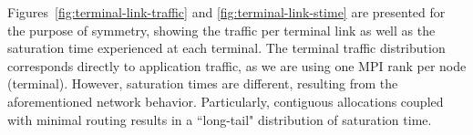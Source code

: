 Figures~\ref{fig:terminal-link-traffic} and \ref{fig:terminal-link-stime} are presented for the purpose of symmetry, 
showing the traffic per terminal link as well as the saturation time experienced at each terminal.
The terminal traffic distribution corresponds directly to application traffic, as we are using one MPI rank per node (terminal).
However, saturation times are different, resulting from the aforementioned network behavior. Particularly, contiguous allocations coupled with minimal routing results in a ``long-tail" distribution of saturation time.

%
%
%
%
%
%



